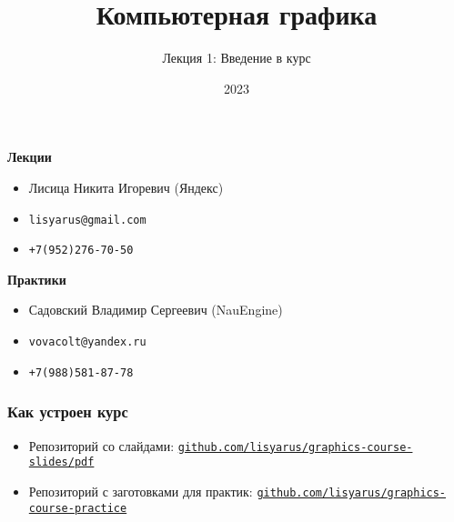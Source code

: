 \documentclass[10pt]{beamer}
\title{Компьютерная графика}
\subtitle{Лекция 1: Введение в курс}
\date{2023}
\begin{document}
\frame{\titlepage}

\begin{frame}
\frametitle{}
\textbf{Лекции}
\begin{itemize}
\item Лисица Никита Игоревич (Яндекс)
\item \nolinkurl{lisyarus@gmail.com}
\item \nolinkurl{+7(952)276-70-50}
\end{itemize}
\textbf{Практики}
\begin{itemize}
\item Садовский Владимир Сергеевич (NauEngine)
\item \nolinkurl{vovacolt@yandex.ru}
\item \nolinkurl{+7(988)581-87-78}
\end{itemize}
\end{frame}

\begin{frame}
\frametitle{Как устроен курс}
\begin{itemize}
\item Репозиторий со слайдами: \href{https://github.com/lisyarus/graphics-course-slides/tree/master/pdf}{\nolinkurl{github.com/lisyarus/graphics-course-slides/pdf}}
\item Репозиторий с заготовками для практик: \href{https://github.com/lisyarus/graphics-course-practice/tree/master/pdf}{\nolinkurl{github.com/lisyarus/graphics-course-practice}}
\end{itemize}
\end{frame}
\end{document}
